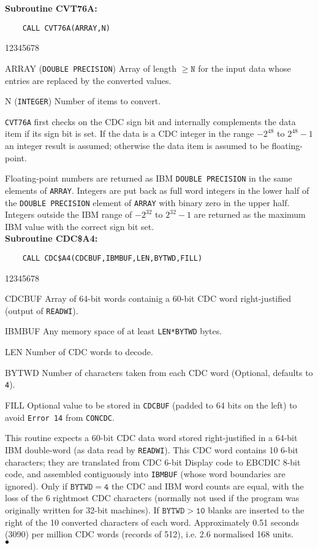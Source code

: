 {\bf Subroutine CVT76A:}
\begin{verbatim}
    CALL CVT76A(ARRAY,N)
\end{verbatim}
\begin{DLtt}{12345678}
\item[ARRAY] ({\tt DOUBLE PRECISION}) Array of length $\mathtt{\geq N}$
for the input data whose entries are replaced by the converted values.
\item[N] ({\tt INTEGER}) Number of items to convert.
\end{DLtt}
\Method
{\tt CVT76A} first checks on the CDC sign bit and internally complements
the data item if its sign bit is set. If the data is a CDC integer in
the range $-2^{48}$ to $2^{48}-1$ an integer result is assumed; otherwise
the data item is assumed to be floating-point.
\par
Floating-point numbers are returned as IBM {\tt DOUBLE PRECISION}
in the same elements of {\tt ARRAY}. Integers are put back as full word
integers in the lower half of the {\tt DOUBLE PRECISION} element of
{\tt ARRAY} with binary zero in the upper half. Integers outside the
IBM range of $-2^{32}$ to $2^{32}-1$ are returned as the maximum IBM
value
with the correct sign bit set. \\[2mm]
{\bf Subroutine CDC\$A4:}
\begin{verbatim}
    CALL CDC$A4(CDCBUF,IBMBUF,LEN,BYTWD,FILL)
\end{verbatim}
\begin{DLtt}{12345678}
\item[CDCBUF] Array of 64-bit words containig a 60-bit CDC word
right-justified (output of {\tt READWI}).
\item[IBMBUF] Any memory space of at least {\tt LEN*BYTWD} bytes.
\item[LEN] Number of CDC words to decode.
\item[BYTWD] Number of characters taken from each CDC word (Optional,
defaults to {\tt 4}).
\item[FILL] Optional value to be stored in {\tt CDCBUF} (padded to 64
bits on the left) to avoid {\tt Error 14} from {\tt CONCDC}.
\end{DLtt}
\Method
This routine expects a 60-bit CDC data word stored right-justified
in a 64-bit IBM double-word (as data read by {\tt READWI}).
This CDC word contains 10 6-bit characters; they are translated
from CDC 6-bit Display code to EBCDIC 8-bit code, and assembled
contiguously into {\tt IBMBUF} (whose word boundaries are ignored). Only
if $\mathtt{BYTWD=4}$  the CDC and IBM word counts are equal, with the loss
of the 6 rightmost CDC characters (normally not used if the program
was originally written for 32-bit machines). If $\mathtt{BYTWD > 10}$ blanks
are inserted to the right of the 10 converted characters of each word.
\Timing
Approximately 0.51 seconds (3090) per million CDC words (records of
512), i.e. 2.6 normalised 168 units.
\\ $\bullet$

